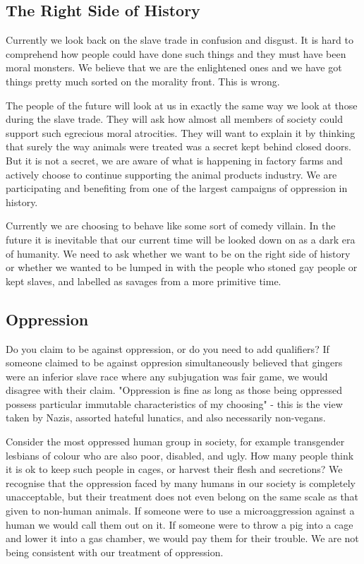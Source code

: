 \subsection{The Right Side of History}

Currently we look back on the slave trade in confusion and disgust. It is hard to comprehend how people could have done such things and they must have been moral monsters. We believe that we are the enlightened ones and we have got things pretty much sorted on the morality front. This is wrong.

The people of the future will look at us in exactly the same way we look at those during the slave trade. They will ask how almost all members of society could support such egrecious moral atrocities. They will want to explain it by thinking that surely the way animals were treated was a secret kept behind closed doors. But it is not a secret, we are aware of what is happening in factory farms and actively choose to continue supporting the animal products industry. We are participating and benefiting from one of the largest campaigns of oppression in history.

Currently we are choosing to behave like some sort of comedy villain. In the future it is inevitable that our current time will be looked down on as a dark era of humanity. We need to ask whether we want to be on the right side of history or whether we wanted to be lumped in with the people who stoned gay people or kept slaves, and labelled as savages from a more primitive time.

\subsection{Oppression}

Do you claim to be against oppression, or do you need to add qualifiers? If someone claimed to be against oppresion simultaneously believed that gingers were an inferior slave race where any subjugation was fair game, we would disagree with their claim. "Oppression is fine as long as those being oppressed possess particular immutable characteristics of my choosing" - this is the view taken by Nazis, assorted hateful lunatics, and also necessarily non-vegans.

Consider the most oppressed human group in society, for example transgender lesbians of colour who are also poor, disabled, and ugly. How many people think it is ok to keep such people in cages, or harvest their flesh and secretions? We recognise that the oppression faced by many humans in our society is completely unacceptable, but their treatment does not even belong on the same scale as that given to non-human animals. If someone were to use a microaggression against a human we would call them out on it. If someone were to throw a pig into a cage and lower it into a gas chamber, we would pay them for their trouble. We are not being consistent with our treatment of oppression. 

